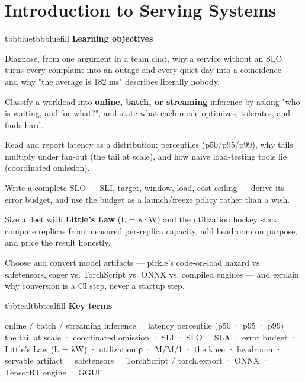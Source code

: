 \setcounter{chapter}{6}
\chapter{Introduction to Serving Systems}

\begin{calloutbox}{tbbblue}{tbbbluefill}
{\normalsize\bfseries\color{tbbblue}Learning objectives}\par\vspace{3pt}
\begin{tbbitemize}
  \item Diagnose, from one argument in a team chat, why a service without an SLO turns every complaint into an outage and every quiet day into a coincidence — and why "the average is 182 ms" describes literally nobody.
  \item Classify a workload into \textbf{online, batch, or streaming} inference by asking "who is waiting, and for what?", and state what each mode optimizes, tolerates, and finds hard.
  \item Read and report latency as a distribution: percentiles (p50/p95/p99), why tails multiply under fan-out (the tail at scale), and how naive load-testing tools lie (coordinated omission).
  \item Write a complete SLO — SLI, target, window, load, cost ceiling — derive its error budget, and use the budget as a launch/freeze policy rather than a wish.
  \item Size a fleet with \textbf{Little's Law} (L = λ·W) and the utilization hockey stick: compute replicas from measured per-replica capacity, add headroom on purpose, and price the result honestly.
  \item Choose and convert model artifacts — pickle's code-on-load hazard vs. safetensors, eager vs. TorchScript vs. ONNX vs. compiled engines — and explain why conversion is a CI step, never a startup step.
\end{tbbitemize}
\end{calloutbox}

\vspace{3.5pt}

\begin{calloutbox}{tbbteal}{tbbtealfill}
{\normalsize\bfseries\color{tbbteal}Key terms}\par\vspace{3pt}
online / batch / streaming inference · latency percentile (p50 · p95 · p99) · the tail at scale · coordinated omission · SLI · SLO · SLA · error budget · Little's Law (L = λW) · utilization ρ · M/M/1 · the knee · headroom · servable artifact · safetensors · TorchScript / torch.export · ONNX · TensorRT engine · GGUF
\end{calloutbox}

